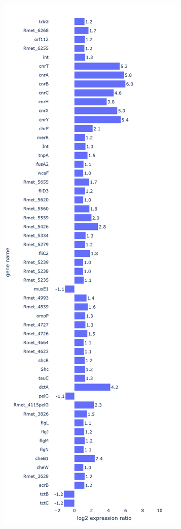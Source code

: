 \begin{figure} [ht]
\begin{center}
\begin{subfigure}{0.48\textwidth}
     \label{fig:4a}
  \end{subfigure}
   \begin{subfigure}{0.48\textwidth}
    \includegraphics[width=\linewidth]{chapter3/chapter/figs/newplot(7).png}

\end{subfigure}
\end{center}
\end{figure}
